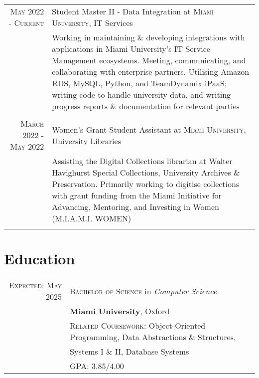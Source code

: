 \documentclass[a4paper,10pt]{article} %
\begin{document}
\begin{tabular}{r|p{11cm}}
\textsc{May 2022 - Current} & Student Master II - Data Integration at \textsc{Miami University}, IT Services \emph{}\\
& \footnotesize{Working in maintaining \& developing integrations with applications in Miami University's IT Service Management ecosystems. Meeting, communicating, and collaborating with enterprise partners.
Utilising Amazon RDS, MySQL, Python, and TeamDynamix iPaaS; writing code to handle university data, and writing progress reports \& documentation for relevant parties}\\
\multicolumn{2}{c}{} \\


\textsc{March 2022 - May 2022} & Women's Grant Student Assistant at \textsc{Miami University}, University Libraries \emph{}\\
& \footnotesize{Assisting the Digital Collections librarian at Walter Havighurst Special Collections, University Archives \& Preservation.
Primarily working to digitise collections with grant funding from the Miami Initiative for Advancing, Mentoring, and Investing in Women (M.I.A.M.I. WOMEN)}\\
\multicolumn{2}{c}{} \\
\end{tabular}\normalsize


\section{Education}

\begin{tabular}{rl}	
\textsc{Expected: May 2025} & \textsc{Bachelor of Science} in \emph{Computer Science}\\ &
\textbf{Miami University}, Oxford\\ &
\footnotesize \textsc{Related Coursework:} Object-Oriented Programming, Data Abstractions \& Structures,\\&
\footnotesize Systems I \& II, Database Systems \\
&\footnotesize \textsc{GPA}: 3.85/4.00\normalsize \\


\end{tabular}
\end{document}
